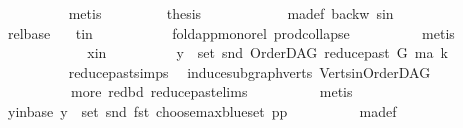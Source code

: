 \begin{isabellebody}
\ \ \ \ \ \ \ \ \isamarkupfalse%
\ metis\ \isanewline
\isanewline
\ \ \ \ \ \ \isamarkupfalse%
\ {\isacharquery}{\kern0pt}thesis\ \isanewline
\ \ \ \ \ \ \ \ \isamarkupfalse%
\ \ ma{\isacharunderscore}{\kern0pt}def\ backw\ s{\isacharunderscore}{\kern0pt}in\isanewline
\ \ \ \ \ \ \ \ \isamarkupfalse%
\ rel{\isacharunderscore}{\kern0pt}base\ \ \isamarkupfalse%
\ t{\isacharunderscore}{\kern0pt}in\ \isanewline
\ \ \ \ \ \ \ \ \isamarkupfalse%
\ fold{\isacharunderscore}{\kern0pt}app{\isacharunderscore}{\kern0pt}mono{\isacharunderscore}{\kern0pt}rel\ prod{\isachardot}{\kern0pt}collapse\isanewline
\ \ \ \ \ \ \ \ \isamarkupfalse%
\ metis\ \ \ \ \ \ \ \isanewline
\ \ \ \ \isamarkupfalse%
\isanewline
\ \ \ \ \ \ \isamarkupfalse%
\ x{\isacharunderscore}{\kern0pt}in\isanewline
\ \ \ \ \ \ \isamarkupfalse%
\ \isamarkupfalse%
\ {\isachardoublequoteopen}y\ {\isasymin}\ set\ {\isacharparenleft}{\kern0pt}snd\ {\isacharparenleft}{\kern0pt}OrderDAG\ {\isacharparenleft}{\kern0pt}reduce{\isacharunderscore}{\kern0pt}past\ G\ ma{\isacharparenright}{\kern0pt}\ k{\isacharparenright}{\kern0pt}{\isacharparenright}{\kern0pt}{\isachardoublequoteclose}\isanewline
\ \ \ \ \ \ \ \ \isamarkupfalse%
\ reduce{\isacharunderscore}{\kern0pt}past{\isachardot}{\kern0pt}simps\ \isamarkupfalse%
\ induce{\isacharunderscore}{\kern0pt}subgraph{\isacharunderscore}{\kern0pt}verts\ Verts{\isacharunderscore}{\kern0pt}in{\isacharunderscore}{\kern0pt}OrderDAG\ \isanewline
\ \ \ \ \ \ \ \ \ \ more\ red{\isacharunderscore}{\kern0pt}bd\ reduce{\isacharunderscore}{\kern0pt}past{\isachardot}{\kern0pt}elims\isanewline
\ \ \ \ \ \ \ \ \isamarkupfalse%
\ {\isacharparenleft}{\kern0pt}metis{\isacharparenright}{\kern0pt}\isanewline
\ \ \ \ \ \ \isamarkupfalse%
\ \isamarkupfalse%
\ y{\isacharunderscore}{\kern0pt}in{\isacharunderscore}{\kern0pt}base{\isacharcolon}{\kern0pt}\ {\isachardoublequoteopen}y\ {\isasymin}\ set\ {\isacharparenleft}{\kern0pt}snd\ {\isacharparenleft}{\kern0pt}fst\ {\isacharparenleft}{\kern0pt}choose{\isacharunderscore}{\kern0pt}max{\isacharunderscore}{\kern0pt}blue{\isacharunderscore}{\kern0pt}set\ pp{\isacharparenright}{\kern0pt}{\isacharparenright}{\kern0pt}{\isacharparenright}{\kern0pt}{\isachardoublequoteclose}\isanewline
\ \ \ \ \ \ \ \ \isamarkupfalse%
\ ma{\isacharunderscore}{\kern0pt}def\ \isamarkupfalse%

\end{isabellebody}
